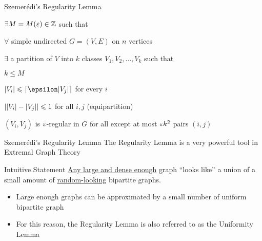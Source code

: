 \begin{frame}{Szemer\'{e}di's Regularity Lemma}

{
\begin{theorem}
\begin{description}[abc]
	\item<2->[$\bullet$] $\exists M = M(\varepsilon) \in {\mathbb Z}$ such that
	\begin{description}[abc]
		\item<3->[$\bullet$]  $\forall$ simple undirected  $G=(V,E)$ on $n$ vertices
		\begin{description}[abc]
			\item<4->[$\bullet$]  $\exists$ a partition of $V$ into $k$ classes $V_1, V_2, \dotsc, V_k$ such that
			\begin{description}[abc]
				\item<5->[$\bullet$] $k \leq M$
				\item<6->[$\bullet$] $|V_i| \leq \ceil{\epsilon |V_j|}$ for every $i$
				\item<7->[$\bullet$] $\left\vert{ |V_i| - |V_j| }\right\vert \leqslant 1$ for all $i,j$ (equipartition)
				\item<8->[$\bullet$] $(V_i, V_j)$ is $\varepsilon$-regular in $G$ for all except at most $\varepsilon k^2$ pairs $(i,j)$
			\end{description}
		\end{description}
	\end{description}
\end{description}
\end{theorem}}

\end{frame}

\begin{frame}{Szemer\'{e}di's Regularity Lemma}
The Regularity Lemma is a very powerful tool in Extremal Graph Theory
 
\begin{block}{Intuitive Statement}
	\ul{Any large and dense enough} graph ``looks like'' a union of a small amount of \ul{random-looking} bipartite graphs.
\end{block}

\begin{itemize}
	\item<2-> Large enough graphs can be approximated by a small number of uniform bipartite graph
	\item<3-> For this reason, the Regularity Lemma is also referred to as the Uniformity Lemma
\end{itemize}


\end{frame}

